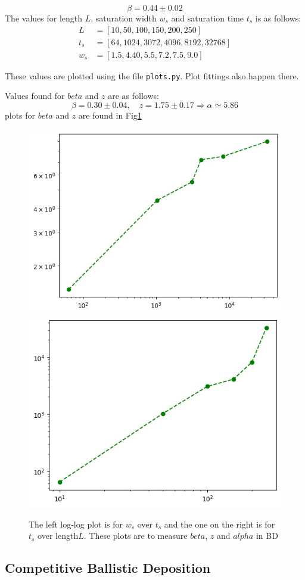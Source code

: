 \documentclass[12pt]{article}
\begin{document}
\begin{equation*}
	\beta = 0.44 \pm 0.02
\end{equation*}
The values for length $L$, saturation width $w_s$ and saturation time $t_s$ is as follows:
\begin{equation*}
	\begin{aligned}
		L		 &= [10, 50, 100, 150, 200, 250]\\
		t_s		&= [64, 1024, 3072, 4096, 8192, 32768]\\
		w_s	  &= [1.5, 4.40, 5.5, 7.2, 7.5, 9.0] 
	\end{aligned}
\end{equation*}

These values are plotted using the file \texttt{plots.py}. Plot fittings also happen there.

Values found for $beta$ and $z$ are as follows:
\begin{equation*}
	\beta = 0.30 \pm 0.04, \quad z = 1.75 \pm 0.17  \Rightarrow \alpha \simeq 5.86
\end{equation*}
plots for $beta$ and $z$ are found in Fig\ref{fig:BDbeta_z}
\begin{figure}[h!]
	\centering
	\includegraphics[width=.4\linewidth]{../P6/beta.jpg}
	\includegraphics[width=.4\linewidth]{../P6/z.jpg}
	\label{fig:BDbeta_z}
	\caption{The left log-log plot is for $w_s$ over $t_s$ and the one on the right is for 
		$t_s$ over length$L$. These plots are to measure $beta$, $z$ and $alpha$ in BD}
\end{figure}
	
	\subsection{Competitive Ballistic Deposition}
\end{document}
